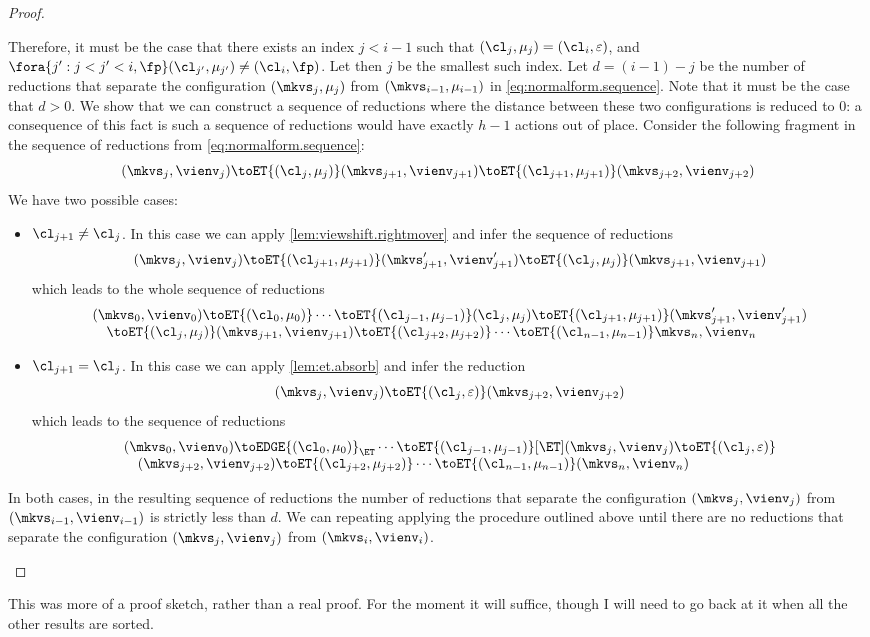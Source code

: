 \begin{proof}
\begin{enumerate}
Therefore, it must be the case that there exists an index $j < i-1$ such that $(\cl_{j}, \mu_{j}) = (\cl_{i}, \varepsilon)$, 
and $\fora{ j': j< j' < i, \fp } (\cl_{j'}, \mu_{j'}) \neq (\cl_{i}, \fp)$. Let then $j$ be the smallest such index. 
Let $d = (i-1)-j$ be the number of reductions that separate the configuration $(\mkvs_{j}, \mu_{j})$ from 
$(\mkvs_{i-1}, \mu_{i-1})$ in \cref{eq:normalform.sequence}. Note that it must be the case that $d > 0$. We show that we can 
construct a sequence of reductions where the distance between these two configurations is reduced to $0$: 
a consequence of this fact is such a sequence of reductions would have exactly $h-1$ actions out of place.
Consider the following fragment in the sequence of reductions from \cref{eq:normalform.sequence}:
\[
(\mkvs_{j}, \vienv_{j}) \toET{(\cl_{j}, \mu_{j})} (\mkvs_{j+1}, \vienv_{j+1}) 
\toET{(\cl_{j+1}, \mu_{j+1})} (\mkvs_{j+2}, \vienv_{j+2})
\]
We have two possible cases: 
\begin{itemize}
\item $\cl_{j+1} \neq \cl_{j}$. In this case we can apply \cref{lem:viewshift.rightmover} and infer the sequence of 
reductions 
\[
(\mkvs_{j}, \vienv_{j}) \toET{(\cl_{j+1}, \mu_{j+1})} (\mkvs_{j+1}', \vienv_{j+1}') 
\toET{(\cl_{j}, \mu_{j})} (\mkvs_{j+1}, \vienv_{j+1})
\]
which leads to the whole sequence of reductions 
\[
\begin{array}{@{}l@{}}
(\mkvs_{0}, \vienv_{0}) \toET{(\cl_{0}, \mu_{0})} \cdots 
\toET{(\cl_{j-1}, \mu_{j-1})} (\cl_{j}, \mu_{j}) 
\toET{(\cl_{j+1}, \mu_{j+1})} (\mkvs'_{j+1}, \vienv'_{j+1})  \\
\quad \toET{(\cl_{j}, \mu_{j})} (\mkvs_{j+1}, \vienv_{j+1})  
\toET{(\cl_{j+2}, \mu_{j+2})} \cdots \toET{(\cl_{n-1}, \mu_{n-1})} \mkvs_{n}, \vienv_{n}
\end{array}
\]
\item $\cl_{j+1} = \cl_{j}$. In this case we can apply \cref{lem:et.absorb} and infer the reduction 
\[
(\mkvs_{j}, \vienv_{j}) \toET{(\cl_{j}, \varepsilon)} (\mkvs_{j+2}, \vienv_{j+2})
\]
which leads to the sequence of reductions 
\[
\begin{array}{@{}l@{}}
(\mkvs_{0}, \vienv_{0}) \toEDGE{(\cl_{0}, \mu_{0})}_{\ET} \cdots 
\toET{(\cl_{j-1}, \mu_{j-1})}[\ET] (\mkvs_{j}, \vienv_{j}) \toET{(\cl_{j}, \varepsilon)}  \\
\quad (\mkvs_{j+2}, \vienv_{j+2}) \toET{(\cl_{j+2}, \mu_{j+2})} \cdots 
\toET{(\cl_{n-1}, \mu_{n-1})} (\mkvs_{n}, \vienv_{n})
\end{array}
\]
\end{itemize}
In both cases, in the resulting sequence of reductions the number of reductions that separate 
the configuration $(\mkvs_{j}, \vienv_{j})$ from $(\mkvs_{i-1}, \vienv_{i-1})$ is strictly 
less than $d$. We can repeating applying the procedure outlined above until there are 
no reductions that separate the configuration $(\mkvs_{j}, \vienv_{j})$ from 
$(\mkvs_{i}, \vienv_{i})$.
\end{enumerate}
\end{proof}
\ac{This was more of a proof sketch, rather than a real proof. For the moment it will suffice, though 
I will need to go back at it when all the other results are sorted.}


